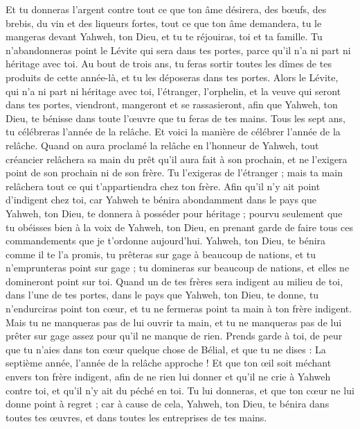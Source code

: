 \begin{multicols}{2}
Et tu donneras l'argent contre tout ce que ton âme désirera, des bœufs, des brebis, du vin et des liqueurs fortes, tout ce que ton âme demandera, tu le mangeras devant Yahweh, ton Dieu, et tu te réjouiras, toi et ta famille.
Tu n'abandonneras point le Lévite qui sera dans tes portes, parce qu'il n'a ni part ni héritage avec toi.
Au bout de trois ans, tu feras sortir toutes les dîmes de tes produits de cette année-là, et tu les déposeras dans tes portes.
Alors le Lévite, qui n'a ni part ni héritage avec toi, l'étranger, l'orphelin, et la veuve qui seront dans tes portes, viendront, mangeront et se rassasieront, afin que Yahweh, ton Dieu, te bénisse dans toute l'œuvre que tu feras de tes mains.
\VerseOne{}Tous les sept ans, tu célébreras l'année de la relâche.
Et voici la manière de célébrer l'année de la relâche. Quand on aura proclamé la relâche en l'honneur de Yahweh, tout créancier relâchera sa main du prêt qu'il aura fait à son prochain, et ne l'exigera point de son prochain ni de son frère.
Tu l'exigeras de l'étranger ; mais ta main relâchera tout ce qui t'appartiendra chez ton frère.
Afin qu'il n'y ait point d'indigent chez toi, car Yahweh te bénira abondamment dans le pays que Yahweh, ton Dieu, te donnera à posséder pour héritage ;
pourvu seulement que tu obéisses bien à la voix de Yahweh, ton Dieu, en prenant garde de faire tous ces commandements que je t'ordonne aujourd'hui.
Yahweh, ton Dieu, te bénira comme il te l'a promis, tu prêteras sur gage à beaucoup de nations, et tu n'emprunteras point sur gage ; tu domineras sur beaucoup de nations, et elles ne domineront point sur toi.
Quand un de tes frères sera indigent au milieu de toi, dans l'une de tes portes, dans le pays que Yahweh, ton Dieu, te donne, tu n'endurciras point ton cœur, et tu ne fermeras point ta main à ton frère indigent.
Mais tu ne manqueras pas de lui ouvrir ta main, et tu ne manqueras pas de lui prêter sur gage assez pour qu'il ne manque de rien.
Prends garde à toi, de peur que tu n'aies dans ton cœur quelque chose de Bélial, et que tu ne dises : La septième année, l'année de la relâche approche ! Et que ton œil soit méchant envers ton frère indigent, afin de ne rien lui donner et qu'il ne crie à Yahweh contre toi, et qu'il n'y ait du péché en toi.
Tu lui donneras, et que ton cœur ne lui donne point à regret ; car à cause de cela, Yahweh, ton Dieu, te bénira dans toutes tes œuvres, et dans toutes les entreprises de tes mains.

\end{multicols}
